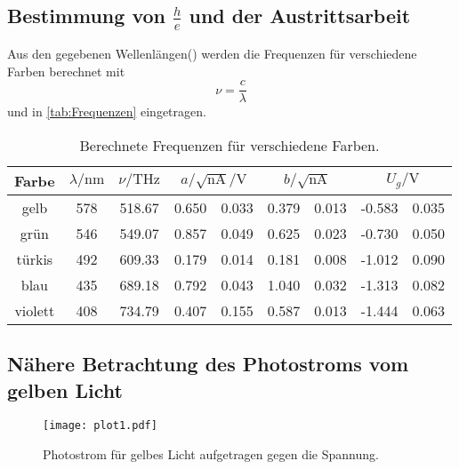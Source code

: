 \subsection{Bestimmung von $\frac{h}{e}$ und der Austrittsarbeit} %
\label{sub:Austrittsarbeit}


Aus den gegebenen Wellenlängen(\cite[80]{v500}) werden die Frequenzen für verschiedene Farben berechnet mit
\begin{equation}
  \nu = \frac{c}{\lambda}
\end{equation} 
und in \autoref{tab:Frequenzen} eingetragen.
\begin{table}[H]
  \centering
  \caption{Berechnete Frequenzen für verschiedene Farben.}
  \label{tab:Frequenzen}
  \begin{tabular}{c S[table-format=3.0] S[table-format=3.2] S@{${}\pm{}$} S S@{${}\pm{}$} S S[table-format=3.3]@{${}\pm{}$} S }
  \toprule
  {Farbe} & {$\lambda / \si{\nano\metre}$} & {$\nu / \si{\tera\hertz}$} & &  &  \\
  \midrule
    gelb    & 578 & 518.67 & 0.650 & 0.033 & 0.379 & 0.013 & -0.583 & 0.035 \\
    grün    & 546 & 549.07 & 0.857 & 0.049 & 0.625 & 0.023 & -0.730 & 0.050 \\
    türkis  & 492 & 609.33 & 0.179 & 0.014 & 0.181 & 0.008 & -1.012 & 0.090 \\
    blau    & 435 & 689.18 & 0.792 & 0.043 & 1.040 & 0.032 & -1.313 & 0.082 \\
    violett & 408 & 734.79 & 0.407 & 0.155 & 0.587 & 0.013 & -1.444 & 0.063 \\
  \bottomrule
  \end{tabular}
\end{table}



\subsection{Nähere Betrachtung des Photostroms vom gelben Licht} %
\label{sub:Nähere Betrachtung des Photostroms vom gelben Licht}

\begin{figure}
  \centering
  \texttt{[image: plot1.pdf]}
  \caption{Photostrom für gelbes Licht aufgetragen gegen die Spannung.}
  \label{fig:plot1}
\end{figure}

